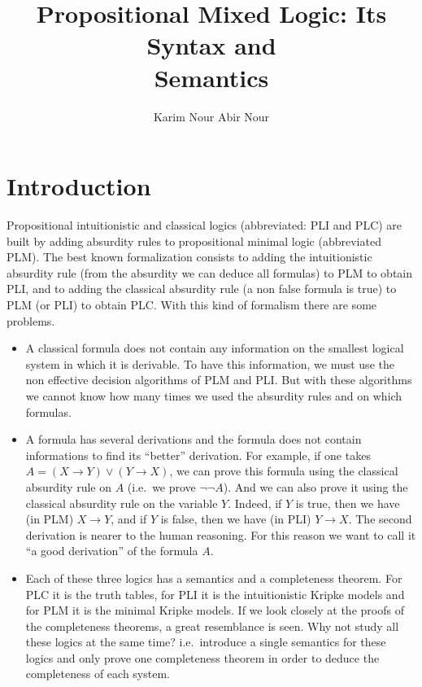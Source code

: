 \documentclass{jancl}
\title[Propositional Mixed Logic]{Propositional Mixed Logic:
Its Syntax and\\ Semantics}
\author{Karim Nour\fup{*} \andauthor\/ Abir Nour\fup{**}}
\begin{document}
\maketitle

\section{Introduction}

Propositional intuitionistic and classical logics (abbreviated: PLI and
PLC) are built by adding absurdity rules to propositional minimal logic
(abbreviated PLM). The best known formalization consists to adding the
intuitionistic absurdity rule (from the absurdity we can deduce all
formulas) to PLM to obtain PLI, and to adding the classical absurdity rule
(a non false formula is true) to PLM (or PLI) to obtain PLC. With this
kind of formalism there are some problems.

\begin{itemize}
\item A classical formula does not contain any information on the
smallest logical system in which it is derivable. To have this
information, we must use the non effective decision algorithms of
PLM and PLI. But with these algorithms we cannot know how many
times we used the absurdity rules and on which formulas.

\item A formula has several derivations and the formula does not
contain informations to find its ``better'' derivation. For
example, if one takes $A = (X {\rightarrow} Y) {\vee} (Y {\rightarrow} X)$, we can prove
this formula using the classical absurdity rule on $A$ (i.e.\  we
prove ${\neg} {\neg} A$).  And we can also prove it using the
classical absurdity rule on the variable $Y$. Indeed, if $Y$ is
true, then we have (in PLM) $X {\rightarrow} Y$, and if $Y$ is false, then we
have (in PLI) $Y {\rightarrow} X$. The second derivation is nearer to the
human reasoning. For this reason we want to call it ``a good
derivation'' of the formula $A$.

\item Each of these three logics has a semantics and a
completeness theorem. For PLC it is the truth tables, for PLI it
is the intuitionistic Kripke models and for PLM it is the minimal
Kripke models. If we look closely at the proofs of the
completeness theorems, a great resemblance is seen. Why not study
all these logics at the same time? i.e.\  introduce a single
semantics for these logics and only prove one completeness theorem
in order to deduce the completeness of each system.
\end{itemize}
\end{document}
